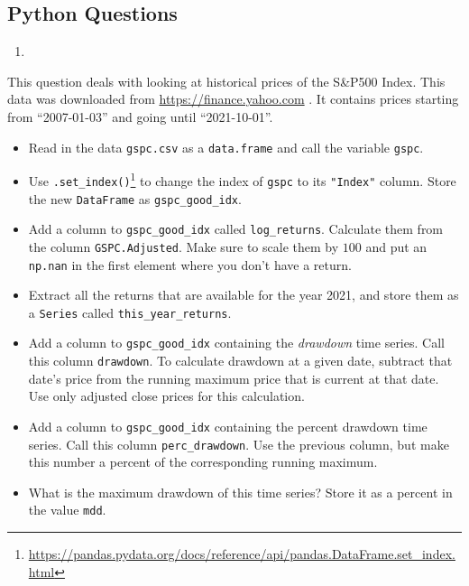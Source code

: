 \documentclass[
  12pt,
  krantz2]{krantz}
\providecommand{\tightlist}{%
  \setlength{\itemsep}{0pt}\setlength{\parskip}{0pt}}
\renewcommand{\href}[2]{#2\footnote{\url{#1}}}
\begin{document}
\hypertarget{python-questions-6}{%
\subsection{Python Questions}\label{python-questions-6}}

\begin{enumerate}
\def\labelenumi{\arabic{enumi}.}
\tightlist
\item
\end{enumerate}

This question deals with looking at historical prices of the S\&P500 Index. This data was downloaded from \url{https://finance.yahoo.com} \citep{gspc_data}. It contains prices starting from ``2007-01-03'' and going until ``2021-10-01''.

\begin{itemize}
\tightlist
\item
  Read in the data \texttt{gspc.csv} as a \texttt{data.frame} and call the variable \texttt{gspc}.
\item
  Use \href{https://pandas.pydata.org/docs/reference/api/pandas.DataFrame.set_index.html}{\texttt{.set\_index()}} to change the index of \texttt{gspc} to its \texttt{"Index"} column. Store the new \texttt{DataFrame} as \texttt{gspc\_good\_idx}.
\item
  Add a column to \texttt{gspc\_good\_idx} called \texttt{log\_returns}. Calculate them from the column \texttt{GSPC.Adjusted}. Make sure to scale them by \(100\) and put an \texttt{np.nan} in the first element where you don't have a return.
\item
  Extract all the returns that are available for the year 2021, and store them as a \texttt{Series} called \texttt{this\_year\_returns}.
\item
  Add a column to \texttt{gspc\_good\_idx} containing the \emph{drawdown} time series. Call this column \texttt{drawdown}. To calculate drawdown at a given date, subtract that date's price from the running maximum price that is current at that date. Use only adjusted close prices for this calculation.\\
\item
  Add a column to \texttt{gspc\_good\_idx} containing the percent drawdown time series. Call this column \texttt{perc\_drawdown}. Use the previous column, but make this number a percent of the corresponding running maximum.
\item
  What is the maximum drawdown of this time series? Store it as a percent in the value \texttt{mdd}.
\end{itemize}
\end{document}
